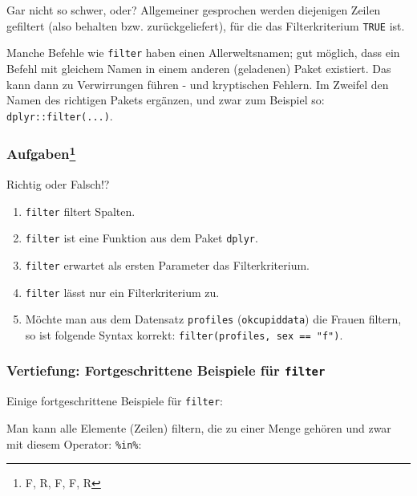 \documentclass[12pt,ngerman,]{book}
\makeatletter
\newenvironment{Shaded}{\begin{snugshade}}{\end{snugshade}}
\newcommand{\KeywordTok}[1]{\textcolor[rgb]{0.13,0.29,0.53}{\textbf{{#1}}}}
\newcommand{\StringTok}[1]{\textcolor[rgb]{0.31,0.60,0.02}{{#1}}}
\newcommand{\NormalTok}[1]{{#1}}
\providecommand{\tightlist}{%
  \setlength{\itemsep}{0pt}\setlength{\parskip}{0pt}}
\let\rmarkdownfootnote\footnote%
\def\footnote{\protect\rmarkdownfootnote}
\newenvironment{kframe}{%
\medskip{}
\setlength{\fboxsep}{.8em}
 \def\at@end@of@kframe{}%
 \ifinner\ifhmode%
  \def\at@end@of@kframe{\end{minipage}}%
  \begin{minipage}{\columnwidth}%
 \fi\fi%
 \def\FrameCommand##1{\hskip\@totalleftmargin \hskip-\fboxsep
 \colorbox{shadecolor}{##1}\hskip-\fboxsep
     \hskip-\linewidth \hskip-\@totalleftmargin \hskip\columnwidth}%
 \MakeFramed {\advance\hsize-\width
   \@totalleftmargin\z@ \linewidth\hsize
   \@setminipage}}%
 {\par\unskip\endMakeFramed%
 \at@end@of@kframe}
\renewenvironment{Shaded}{\begin{kframe}}{\end{kframe}}
\let\BeginKnitrBlock\begin \let\EndKnitrBlock\end
\makeatother
\begin{document}
Gar nicht so schwer, oder? Allgemeiner gesprochen werden diejenigen
Zeilen gefiltert (also behalten bzw. zurückgeliefert), für die das
Filterkriterium \texttt{TRUE} ist.

\BeginKnitrBlock{rmdcaution}
Manche Befehle wie \texttt{filter} haben einen Allerweltsnamen; gut
möglich, dass ein Befehl mit gleichem Namen in einem anderen (geladenen)
Paket existiert. Das kann dann zu Verwirrungen führen - und kryptischen
Fehlern. Im Zweifel den Namen des richtigen Pakets ergänzen, und zwar
zum Beispiel so: \texttt{dplyr::filter(...)}.
\EndKnitrBlock{rmdcaution}

\subsubsection[Aufgaben]{\texorpdfstring{Aufgaben\footnote{F, R, F, F, R}}{Aufgaben}}\label{aufgaben-3}

\BeginKnitrBlock{rmdexercises}
Richtig oder Falsch!?

\begin{enumerate}
\def\labelenumi{\arabic{enumi}.}
\tightlist
\item
  \texttt{filter} filtert Spalten.
\item
  \texttt{filter} ist eine Funktion aus dem Paket \texttt{dplyr}.
\item
  \texttt{filter} erwartet als ersten Parameter das Filterkriterium.
\item
  \texttt{filter} lässt nur ein Filterkriterium zu.
\item
  Möchte man aus dem Datensatz \texttt{profiles} (\texttt{okcupiddata})
  die Frauen filtern, so ist folgende Syntax korrekt:
  \texttt{filter(profiles,\ sex\ ==\ "f")}.
\end{enumerate}
\EndKnitrBlock{rmdexercises}

\subsubsection{\texorpdfstring{Vertiefung: Fortgeschrittene Beispiele
für
\texttt{filter}}{Vertiefung: Fortgeschrittene Beispiele für filter}}\label{vertiefung-fortgeschrittene-beispiele-fur-filter}

Einige fortgeschrittene Beispiele für \texttt{filter}:

Man kann alle Elemente (Zeilen) filtern, die zu einer Menge gehören und
zwar mit diesem Operator: \texttt{\%in\%}:

\begin{Shaded}
\end{Shaded}
\end{document}
